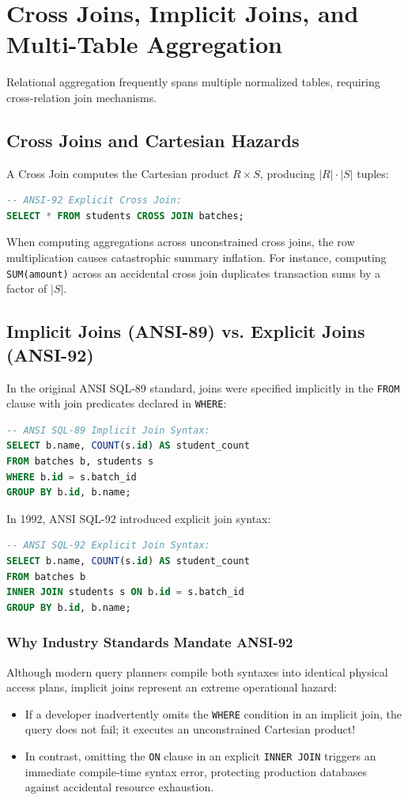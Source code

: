 \documentclass[10pt,twocolumn,letterpaper]{article}
\begin{document}
\section{Cross Joins, Implicit Joins, and Multi-Table Aggregation}
\label{sec:joins_and_aggregation}

Relational aggregation frequently spans multiple normalized tables, requiring cross-relation join mechanisms.

\subsection{Cross Joins and Cartesian Hazards}
A Cross Join computes the Cartesian product $R \times S$, producing $|R| \cdot |S|$ tuples:
\begin{lstlisting}[language=SQL]
-- ANSI-92 Explicit Cross Join:
SELECT * FROM students CROSS JOIN batches;
\end{lstlisting}
When computing aggregations across unconstrained cross joins, the row multiplication causes catastrophic summary inflation. For instance, computing \texttt{SUM(amount)} across an accidental cross join duplicates transaction sums by a factor of $|S|$.

\subsection{Implicit Joins (ANSI-89) vs. Explicit Joins (ANSI-92)}
In the original ANSI SQL-89 standard, joins were specified implicitly in the \texttt{FROM} clause with join predicates declared in \texttt{WHERE}:
\begin{lstlisting}[language=SQL]
-- ANSI SQL-89 Implicit Join Syntax:
SELECT b.name, COUNT(s.id) AS student_count
FROM batches b, students s
WHERE b.id = s.batch_id
GROUP BY b.id, b.name;
\end{lstlisting}

In 1992, ANSI SQL-92 introduced explicit join syntax:
\begin{lstlisting}[language=SQL]
-- ANSI SQL-92 Explicit Join Syntax:
SELECT b.name, COUNT(s.id) AS student_count
FROM batches b
INNER JOIN students s ON b.id = s.batch_id
GROUP BY b.id, b.name;
\end{lstlisting}

\subsubsection{Why Industry Standards Mandate ANSI-92}
Although modern query planners compile both syntaxes into identical physical access plans, implicit joins represent an extreme operational hazard:
\begin{itemize}
    \item If a developer inadvertently omits the \texttt{WHERE} condition in an implicit join, the query does not fail; it executes an unconstrained Cartesian product!
    \item In contrast, omitting the \texttt{ON} clause in an explicit \texttt{INNER JOIN} triggers an immediate compile-time syntax error, protecting production databases against accidental resource exhaustion.
\end{itemize}
\end{document}
